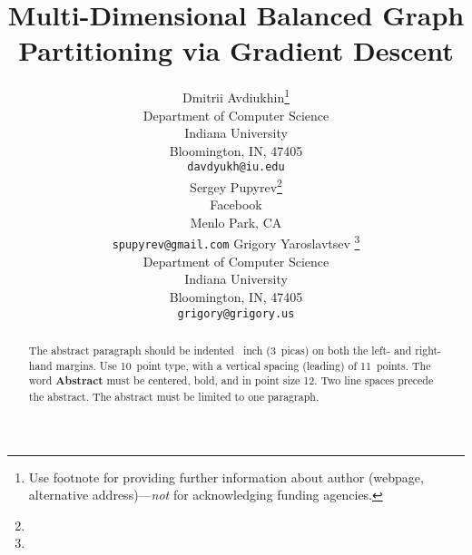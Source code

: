 \documentclass{article}
\title{Multi-Dimensional Balanced Graph Partitioning via Gradient Descent}
\author{
  Dmitrii Avdiukhin\thanks{Use footnote for providing further
    information about author (webpage, alternative
    address)---\emph{not} for acknowledging funding agencies.} \\
  Department of Computer Science\\
  Indiana University\\
  Bloomington, IN, 47405 \\
  \texttt{davdyukh@iu.edu} \\
  \And
  Sergey Pupyrev\thanks{} \\
  Facebook \\
  Menlo Park, CA\\
  \texttt{spupyrev@gmail.com}
 \And
 Grigory Yaroslavtsev \thanks{}\\
 Department of Computer Science \\
 Indiana University\\
 Bloomington, IN, 47405 \\
 \texttt{grigory@grigory.us}
}
\begin{document}

\listoftodos

\tableofcontents

\newpage


\maketitle

\begin{abstract}
  The abstract paragraph should be indented ~inch
  (3~picas) on both the left- and right-hand margins. Use 10~point
  type, with a vertical spacing (leading) of 11~points.  The word
  \textbf{Abstract} must be centered, bold, and in point size 12. Two
  line spaces precede the abstract. The abstract must be limited to
  one paragraph.
\end{abstract}







\newpage
\appendix





\end{document}
